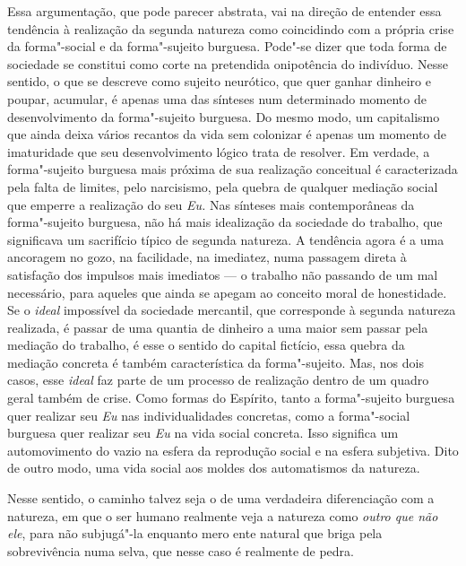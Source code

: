 Essa argumentação, que pode parecer abstrata, vai na direção de entender
essa tendência à realização da segunda natureza como coincidindo com a
própria crise da forma"-social e da forma"-sujeito burguesa. Pode"-se dizer
que toda forma de sociedade se constitui como corte na pretendida
onipotência do indivíduo. Nesse sentido, o que se descreve como sujeito
neurótico, que quer ganhar dinheiro e poupar, acumular, é apenas uma das
sínteses num determinado momento de desenvolvimento da forma"-sujeito
burguesa. Do mesmo modo, um capitalismo que ainda deixa vários recantos
da vida sem colonizar é apenas um momento de imaturidade que seu
desenvolvimento lógico trata de resolver. Em verdade, a forma"-sujeito
burguesa mais próxima de sua realização conceitual é caracterizada pela
falta de limites, pelo narcisismo, pela quebra de qualquer mediação
social que emperre a realização do seu \emph{Eu.} Nas sínteses mais
contemporâneas da forma"-sujeito burguesa, não há mais idealização da
sociedade do trabalho, que significava um sacrifício típico de segunda
natureza. A tendência agora é a uma ancoragem no gozo, na facilidade, na
imediatez, numa passagem direta à satisfação dos impulsos mais imediatos
--- o trabalho não passando de um mal necessário, para aqueles que ainda
se apegam ao conceito moral de honestidade. Se o \emph{ideal} impossível
da sociedade mercantil, que corresponde à segunda natureza realizada, é
passar de uma quantia de dinheiro a uma maior sem passar pela mediação
do trabalho, é esse o sentido do capital fictício, essa quebra da
mediação concreta é também característica da forma"-sujeito. Mas, nos
dois casos, esse \emph{ideal} faz parte de um processo de realização
dentro de um quadro geral também de crise. Como formas do Espírito,
tanto a forma"-sujeito burguesa quer realizar seu \emph{Eu} nas
individualidades concretas, como a forma"-social burguesa quer realizar
seu \emph{Eu} na vida social concreta. Isso significa um automovimento
do vazio na esfera da reprodução social e na esfera subjetiva. Dito de
outro modo, uma vida social aos moldes dos automatismos da natureza.

Nesse sentido, o caminho talvez seja o de uma verdadeira diferenciação
com a natureza, em que o ser humano realmente veja a natureza como
\emph{outro que não ele}, para não subjugá"-la enquanto mero ente natural
que briga pela sobrevivência numa selva, que nesse caso é realmente de
pedra.


